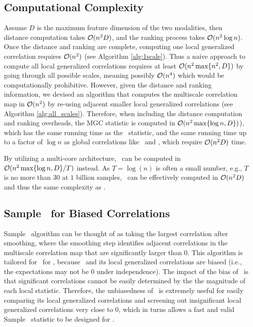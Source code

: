 \documentclass[11pt]{extarticle}
\begin{document}
\subsection{Computational Complexity}

Assume $D$ is the maximum feature dimension of the two modalities, then distance computation takes $\mathcal{O}(n^2 D)$, and the ranking process takes $\mathcal{O}(n^2 \log n)$. Once the distance and ranking are complete, computing one local generalized correlation requires $\mathcal{O}(n^2)$ (see Algorithm \ref{alg:1scale}). Thus a naive approach to compute all local generalized correlations requires at least $\mathcal{O}(n^2 \max\{n^2, D\})$ by going through all possible scales, meaning possibly $\mathcal{O}(n^4)$ which would be computationally prohibitive. However, given the distance and ranking information, we devised an algorithm that computes the multiscale correlation map in $\mathcal{O}(n^2)$ by re-using adjacent smaller local generalized correlations (see Algorithm \ref{alg:all_scales}).
Therefore, when including the distance computation and ranking overheads, the MGC statistic is computed in $\mathcal{O}(n^2 \max\{\log n,D\})$), which has the same running time as the \Hhg~statistic, and the same running time up to a factor of $\log n$ as  global correlations like \Dcorr~and \Mcorr, which require  $\mathcal{O}(n^2D)$ time.

By utilizing a multi-core architecture, \Mgc~can be computed in $\mathcal{O}(n^2 \max\{\log n,D\}/T)$ instead. As $T=\log(n)$ is often a small number, e.g., $T$ is no more than $30$ at $1$ billion samples, \Mgc~can be effectively computed in $\mathcal{O}(n^2 D)$ and thus the same complexity as \Dcorr.

\subsection{Sample \Mgc~for Biased Correlations}

Sample \Mgc~algorithm can be thought of as taking the largest correlation after smoothing, where the smoothing step identifies adjacent correlations in the multiscale correlation map that are significantly larger than $0$. This algorithm is tailored for \Mgc~for \Mcorr, because \Dcorr~and its local generalized correlations are biased (i.e., the expectations may not be $0$ under independence). The impact of the bias of \Dcorr~is that significant correlations cannot be easily determined by the the magnitude of each local statistic. Therefore, the unbiasedness of \Mcorr~is extremely useful for easily comparing its local generalized correlations and screening out insignificant local generalized correlations very close to $0$, which in turns allows a fast and valid Sample \Mgc~statistic to be designed for \Mcorr.
\end{document}
